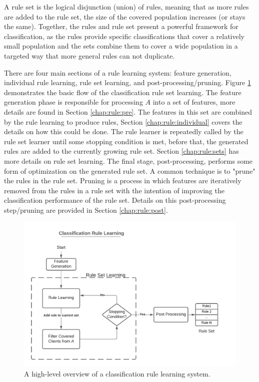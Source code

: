 A rule set is the logical disjunction (union) of rules, meaning that as more rules are added to the rule set, the size of the covered population increases (or stays the same). Together, the rules and rule set present a powerful framework for classification, as the rules provide specific classifications that cover a relatively small population and the sets combine them to cover a wide population in a targeted way that more general rules can not duplicate.


There are four main sections of a rule learning system: feature generation, individual rule learning, rule set learning, and post-processing/pruning. 
Figure \ref{fig:covering} demonstrates the basic flow of the classification rule set learning. The feature generation phase is responsible for processing $A$ into a set of features, more details are found in Section \ref{chap:rule:pre}. The features in this set are combined by the rule learning to produce rules, Section \ref{chap:rule:individual} covers the details on how this could be done. The rule learner is repeatedly called by the rule set learner until some stopping condition is met, before that, the generated rules are added to the currently growing rule set. Section \ref{chap:rule:sets} has more details on rule set learning. The final stage, post-processing, performs some form of optimization on the generated rule set. A common technique is to "prune" the rules in the rule set. Pruning is a process in which features are iteratively removed from the rules in a rule set with the intention of improving the classification performance of the rule set. Details on this post-processing step/pruning are provided in Section \ref{chap:rule:post}.




\begin{figure}[h]
    \centering
    \includegraphics[width=1\textwidth]{Figures/Covering-Algorithm.pdf}
    \caption{A high-level overview of a classification rule learning system.}
		\label{fig:covering}
\end{figure}


